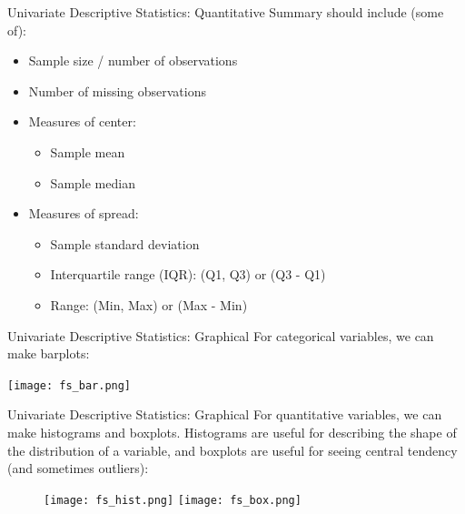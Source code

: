 \documentclass[10pt,t]{beamer}
\begin{document}
\begin{frame}{Univariate Descriptive Statistics: Quantitative}
Summary should include (some of):

\vspace{0.3cm}

\begin{itemize}
	\item Sample size / number of observations
	\medskip
	\item Number of missing observations
	\medskip
	\item Measures of center:
	\begin{itemize}
			\smallskip
		\item Sample mean
			\smallskip
		\item Sample median
	\end{itemize}
\medskip
	\item Measures of spread:
	\begin{itemize}
		\smallskip
		\item Sample standard deviation
			\smallskip
		\item Interquartile range (IQR): (Q1, Q3) or (Q3 - Q1)
			\smallskip
		\item Range: (Min, Max) or (Max - Min)
	\end{itemize}
\end{itemize}

\end{frame}

\begin{frame}{Univariate Descriptive Statistics: Graphical}
For categorical variables, we can make barplots:

\vspace{0.3cm}

\centering \texttt{[image: fs\_bar.png]}

\end{frame}

\begin{frame}{Univariate Descriptive Statistics: Graphical}
For quantitative variables, we can make histograms and boxplots. Histograms are useful for describing the shape of the distribution of a variable, and boxplots are useful for seeing central tendency (and sometimes outliers):

\vspace{0.4cm}

\begin{figure}
	\centering
	\texttt{[image: fs\_hist.png]}
	\hspace{0.2cm}
	\texttt{[image: fs\_box.png]}
\end{figure}

\end{frame}
\end{document}

